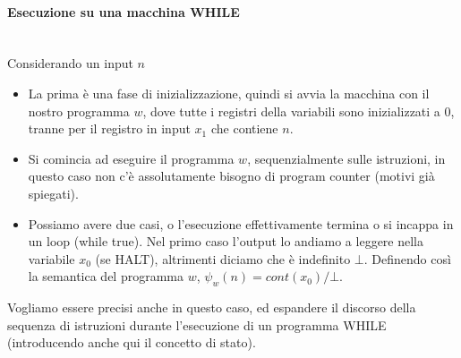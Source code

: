 \documentclass{article}
\begin{document}
\paragraph{Esecuzione su una macchina WHILE}\mbox{}\\
Considerando un input $n$
\begin{itemize}
    \item La prima è una fase di inizializzazione, quindi si avvia la macchina con il nostro
          programma $w$, dove tutte i registri della variabili sono inizializzati a 0, tranne per il registro
          in input $x_1$ che contiene $n$.

    \item Si comincia ad eseguire il programma $w$, sequenzialmente sulle istruzioni, in questo caso non
          c'è assolutamente bisogno di program counter (motivi già spiegati).

    \item Possiamo avere due casi, o l'esecuzione effettivamente termina o si incappa in un loop (while true).
          Nel primo caso l'output lo andiamo a leggere nella variabile $x_0$ (se HALT), altrimenti diciamo che è indefinito
          $\bot$. Definendo così la semantica del programma $w$, $\psi_w(n)=cont(x_0)/\bot$.
\end{itemize}

Vogliamo essere precisi anche in questo caso, ed espandere il discorso della sequenza di istruzioni durante l'esecuzione
di un programma WHILE (introducendo anche qui il concetto di stato).
\end{document}
